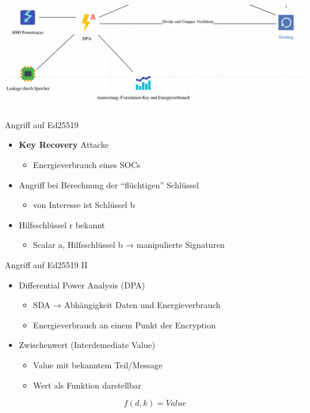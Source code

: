 \documentclass[
  9pt,
  ignorenonframetext,
  aspectratio=169,
]{beamer}
\providecommand{\tightlist}{%
  \setlength{\itemsep}{0pt}\setlength{\parskip}{0pt}}
\begin{document}
\begin{frame}{}
\protect\hypertarget{section-5}{}
\includegraphics{Abbildungen/Punkt4.png}
\end{frame}

\begin{frame}{Angriff auf Ed25519}
\protect\hypertarget{angriff-auf-ed25519}{}
\begin{itemize}
\tightlist
\item
  \textbf{Key Recovery} Attacke

  \begin{itemize}
  \tightlist
  \item
    Energieverbrauch eines SOCs
  \end{itemize}
\item
  Angriff bei Berechnung der ``flüchtigen'' Schlüssel

  \begin{itemize}
  \tightlist
  \item
    von Interesse ist Schlüssel b
  \end{itemize}
\item
  Hilfsschlüssel r bekannt

  \begin{itemize}
  \tightlist
  \item
    Scalar a, Hilfsschlüssel b → manipulierte Signaturen
  \end{itemize}
\end{itemize}
\end{frame}

\begin{frame}{Angriff auf Ed25519 II}
\protect\hypertarget{angriff-auf-ed25519-ii}{}
\begin{itemize}
\tightlist
\item
  Differential Power Analysis (DPA)

  \begin{itemize}
  \tightlist
  \item
    SDA → Abhängigkeit Daten und Energieverbrauch
  \item
    Energieverbrauch an einem Punkt der Encryption
  \end{itemize}
\item
  Zwischenwert (Interdemediate Value)

  \begin{itemize}
  \tightlist
  \item
    Value mit bekanntem Teil/Message
  \item
    Wert als Funktion darstellbar
  \end{itemize}
\end{itemize}

\[ f(d,k) = Value \]
\end{frame}
\end{document}

